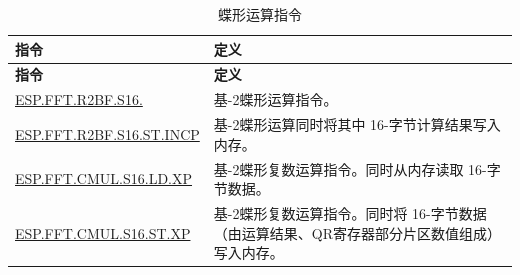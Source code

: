 \begin{longtable}[c]{|l|m{10cm}|}
    \caption{蝶形运算指令}
    \label{tab:pie-butterfly-instructions}\\
    \hline
    \rowcolor{lightgray}
    \textbf{指令} & \textbf{定义} \\\hline
    \endfirsthead
    \rowcolor{lightgray}
    \textbf{指令} & \textbf{定义} \\\hline
    \endhead
    \endfoot

    \hyperref[instruction:ESPFFTR2BFS16]{ESP.FFT.R2BF.S16.} & 基-2蝶形运算指令。
    \\\hline
    \hyperref[instruction:ESPFFTR2BFS16STINCP]{ESP.FFT.R2BF.S16.ST.INCP} & 基-2蝶形运算同时将其中 16-字节计算结果写入内存。
    \\\hline
    \hyperref[instruction:ESPFFTCMULS16LDXP]{ESP.FFT.CMUL.S16.LD.XP} & 基-2蝶形复数运算指令。同时从内存读取 16-字节数据。
    \\\hline
    \hyperref[instruction:ESPFFTCMULS16STXP]{ESP.FFT.CMUL.S16.ST.XP} & 基-2蝶形复数运算指令。同时将 16-字节数据（由运算结果、QR寄存器部分片区数值组成）写入内存。
    \\\hline
\end{longtable}